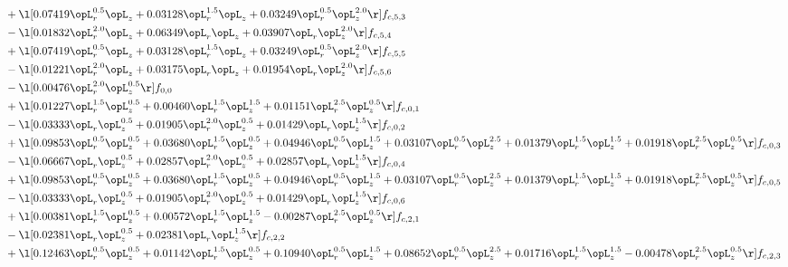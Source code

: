 \begin{alignat}{2}
& + \l[  0.07419 \opL_r^{0.5} \opL_z +  0.03128 \opL_r^{1.5} \opL_z +  0.03249 \opL_r^{0.5} \opL_z^{2.0}  \r] f_{c,5,3} \nonumber \\ 
& - \l[  0.01832 \opL_r^{2.0} \opL_z +  0.06349 \opL_r \opL_z +  0.03907 \opL_r \opL_z^{2.0}  \r] f_{c,5,4} \nonumber \\ 
& + \l[  0.07419 \opL_r^{0.5} \opL_z +  0.03128 \opL_r^{1.5} \opL_z +  0.03249 \opL_r^{0.5} \opL_z^{2.0}  \r] f_{c,5,5} \nonumber \\ 
& - \l[  0.01221 \opL_r^{2.0} \opL_z +  0.03175 \opL_r \opL_z +  0.01954 \opL_r \opL_z^{2.0}  \r] f_{c,5,6} \nonumber \\ 
& - \l[  0.00476 \opL_r^{2.0} \opL_z^{0.5}  \r] f_{0,0} \nonumber \\ 
& + \l[  0.01227 \opL_r^{1.5} \opL_z^{0.5} +  0.00460 \opL_r^{1.5} \opL_z^{1.5} +  0.01151 \opL_r^{2.5} \opL_z^{0.5}  \r] f_{c,0,1} \nonumber \\ 
& - \l[  0.03333 \opL_r \opL_z^{0.5} +  0.01905 \opL_r^{2.0} \opL_z^{0.5} +  0.01429 \opL_r \opL_z^{1.5}  \r] f_{c,0,2} \nonumber \\ 
& + \l[  0.09853 \opL_r^{0.5} \opL_z^{0.5} +  0.03680 \opL_r^{1.5} \opL_z^{0.5} +  0.04946 \opL_r^{0.5} \opL_z^{1.5} +  0.03107 \opL_r^{0.5} \opL_z^{2.5} +  0.01379 \opL_r^{1.5} \opL_z^{1.5} +  0.01918 \opL_r^{2.5} \opL_z^{0.5}  \r] f_{c,0,3} \nonumber \\ 
& - \l[  0.06667 \opL_r \opL_z^{0.5} +  0.02857 \opL_r^{2.0} \opL_z^{0.5} +  0.02857 \opL_r \opL_z^{1.5}  \r] f_{c,0,4} \nonumber \\ 
& + \l[  0.09853 \opL_r^{0.5} \opL_z^{0.5} +  0.03680 \opL_r^{1.5} \opL_z^{0.5} +  0.04946 \opL_r^{0.5} \opL_z^{1.5} +  0.03107 \opL_r^{0.5} \opL_z^{2.5} +  0.01379 \opL_r^{1.5} \opL_z^{1.5} +  0.01918 \opL_r^{2.5} \opL_z^{0.5}  \r] f_{c,0,5} \nonumber \\ 
& - \l[  0.03333 \opL_r \opL_z^{0.5} +  0.01905 \opL_r^{2.0} \opL_z^{0.5} +  0.01429 \opL_r \opL_z^{1.5}  \r] f_{c,0,6} \nonumber \\ 
& + \l[  0.00381 \opL_r^{1.5} \opL_z^{0.5} +  0.00572 \opL_r^{1.5} \opL_z^{1.5}   -0.00287 \opL_r^{2.5} \opL_z^{0.5}  \r] f_{c,2,1} \nonumber \\ 
& - \l[  0.02381 \opL_r \opL_z^{0.5} +  0.02381 \opL_r \opL_z^{1.5}  \r] f_{c,2,2} \nonumber \\ 
& + \l[  0.12463 \opL_r^{0.5} \opL_z^{0.5} +  0.01142 \opL_r^{1.5} \opL_z^{0.5} +  0.10940 \opL_r^{0.5} \opL_z^{1.5} +  0.08652 \opL_r^{0.5} \opL_z^{2.5} +  0.01716 \opL_r^{1.5} \opL_z^{1.5}   -0.00478 \opL_r^{2.5} \opL_z^{0.5}  \r] f_{c,2,3} \nonumber \\ 

\end{alignat}
